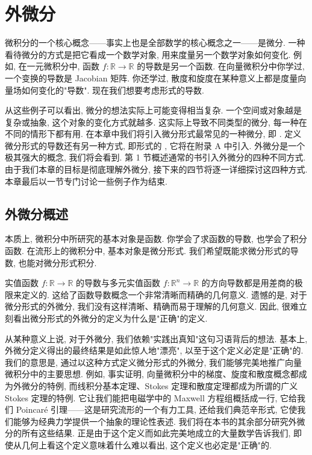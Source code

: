 \chapter{外微分}

微积分的一个核心概念——事实上也是全部数学的核心概念之一——是微分. 一种看待微分的方式是把它看成一个数学对象, 用来度量另一个数学对象如何变化. 例如, 在一元微积分中, 函数 $f:\mathbb{R}\to\mathbb{R}$ 的导数是另一个函数. 在向量微积分中你学过, 一个变换的导数是 Jacobian 矩阵. 你还学过, 散度和旋度在某种意义上都是度量向量场如何变化的"导数". 现在我们想要考虑形式的导数.

从这些例子可以看出, 微分的想法实际上可能变得相当复杂. 一个空间或对象越是复杂或抽象, 这个对象的变化方式就越多. 这实际上导致不同类型的微分, 每一种在不同的情形下都有用. 在本章中我们将引入微分形式最常见的一种微分, 即 . 定义微分形式的导数还有另一种方式, 即形式的 , 它将在附录 A 中引入. 外微分是一个极其强大的概念, 我们将会看到. 第 1 节概述通常的书引入外微分的四种不同方式. 由于我们本章的目标是彻底理解外微分, 接下来的四节将逐一详细探讨这四种方式. 本章最后以一节专门讨论一些例子作为结束.

\section{外微分概述}

本质上, 微积分中所研究的基本对象是函数. 你学会了求函数的导数, 也学会了积分函数. 在流形上的微积分中, 基本对象是微分形式. 我们希望既能求微分形式的导数, 也能对微分形式积分.

实值函数 $f:\mathbb{R}\to\mathbb{R}$ 的导数与多元实值函数 $f:\mathbb{R}^n\to\mathbb{R}$ 的方向导数都是用差商的极限来定义的. 这给了函数导数概念一个非常清晰而精确的几何意义. 遗憾的是, 对于微分形式的外微分, 我们没有这样清晰、精确而易于理解的几何意义. 因此, 很难立刻看出微分形式的外微分的定义为什么是"正确"的定义.

从某种意义上说, 对于外微分, 我们依赖"实践出真知"这句习语背后的想法. 基本上, 外微分定义得出的最终结果是如此惊人地"漂亮", 以至于这个定义必定是"正确"的. 我们的意思是, 通过以这种方式定义微分形式的外微分, 我们能够完美地推广向量微积分中的主要思想. 例如, 事实证明, 向量微积分中的梯度、旋度和散度概念都成为外微分的特例, 而线积分基本定理、Stokes 定理和散度定理都成为所谓的广义 Stokes 定理的特例. 它让我们能把电磁学中的 Maxwell 方程组概括成一行, 它给我们 Poincaré 引理——这是研究流形的一个有力工具, 还给我们典范辛形式, 它使我们能够为经典力学提供一个抽象的理论性表述. 我们将在本书的其余部分研究外微分的所有这些结果. 正是由于这个定义而如此完美地成立的大量数学告诉我们, 即使从几何上看这个定义意味着什么难以看出, 这个定义也必定是"正确"的.

